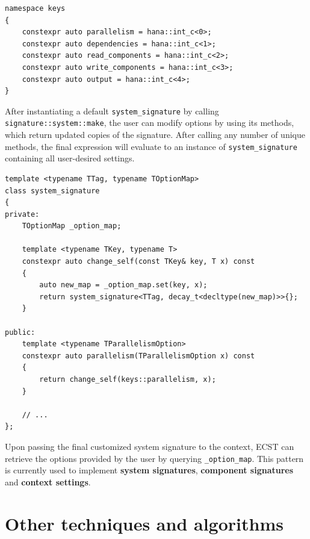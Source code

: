 \documentclass[twoside, 12pt, a4paper, openright]{book}
\begin{document}
\begin{verbatim}
namespace keys
{
    constexpr auto parallelism = hana::int_c<0>;
    constexpr auto dependencies = hana::int_c<1>;
    constexpr auto read_components = hana::int_c<2>;
    constexpr auto write_components = hana::int_c<3>;
    constexpr auto output = hana::int_c<4>;
}
\end{verbatim}

After instantiating a default
\texttt{system_signature}
by calling
\texttt{signature::system::make},
the user can modify options by using its methods, which return updated
copies of the signature. After calling any number of unique methods, the
final expression will evaluate to an instance of
\texttt{system_signature}
containing all user-desired settings.

\begin{verbatim}
template <typename TTag, typename TOptionMap>
class system_signature
{
private:
    TOptionMap _option_map;

    template <typename TKey, typename T>
    constexpr auto change_self(const TKey& key, T x) const
    {
        auto new_map = _option_map.set(key, x);
        return system_signature<TTag, decay_t<decltype(new_map)>>{};
    }

public:
    template <typename TParallelismOption>
    constexpr auto parallelism(TParallelismOption x) const
    {
        return change_self(keys::parallelism, x);
    }

    // ...
};
\end{verbatim}

Upon passing the final customized system signature to the context, ECST
can retrieve the options provided by the user by querying
\texttt{_option_map}.
This pattern is currently used to implement \textbf{system signatures},
\textbf{component signatures} and \textbf{context settings}.

\section{Other techniques and
algorithms}\label{other-techniques-and-algorithms}
\end{document}
